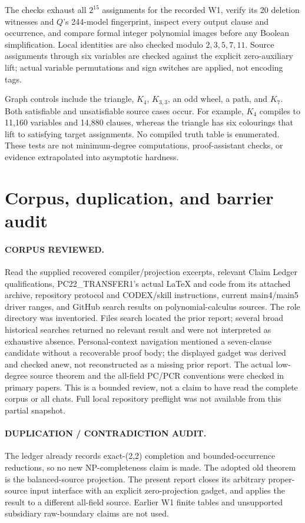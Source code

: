 \documentclass[11pt]{article}
\begin{document}
The checks exhaust all $2^{15}$ assignments for the recorded W1, verify its
20 deletion witnesses and $Q$'s 244-model fingerprint, inspect every output
clause and occurrence, and compare formal integer polynomial images before
any Boolean simplification. Local identities are also checked modulo
$2,3,5,7,11$. Source assignments through six variables are checked against
the explicit zero-auxiliary lift; actual variable permutations and sign
switches are applied, not encoding tags.

Graph controls include the triangle, $K_4$, $K_{3,3}$, an odd wheel, a path,
and $K_7$. Both satisfiable and unsatisfiable source cases occur. For example,
$K_4$ compiles to 11,160 variables and 14,880 clauses, whereas the triangle
has six colourings that lift to satisfying target assignments. No compiled
truth table is enumerated. These tests are not minimum-degree computations,
proof-assistant checks, or evidence extrapolated into asymptotic hardness.

\section{Corpus, duplication, and barrier audit}
\paragraph{CORPUS REVIEWED.}
Read the supplied recovered compiler/projection excerpts, relevant Claim
Ledger qualifications, PC22\_TRANSFER1's actual LaTeX and code from its attached
archive, repository protocol and CODEX/skill instructions, current main4/main5
driver ranges, and GitHub search results on polynomial-calculus sources.
The role directory was inventoried. Files search located the prior report;
several broad historical searches returned no relevant result and were not
interpreted as exhaustive absence. Personal-context navigation mentioned a
seven-clause candidate without a recoverable proof body; the displayed gadget
was derived and checked anew, not reconstructed as a missing prior report.
The actual low-degree source theorem and the all-field PC/PCR conventions were
checked in primary papers. This is a bounded review, not a claim to have read
the complete corpus or all chats. Full local repository preflight was not
available from this partial snapshot.

\paragraph{DUPLICATION / CONTRADICTION AUDIT.}
The ledger already records exact-(2,2) completion and bounded-occurrence
reductions, so no new NP-completeness claim is made. The adopted old theorem
is the balanced-source projection. The present report closes its arbitrary
proper-source input interface with an explicit zero-projection gadget, and
applies the result to a different all-field source. Earlier W1 finite tables
and unsupported subsidiary raw-boundary claims are not used.
\end{document}
